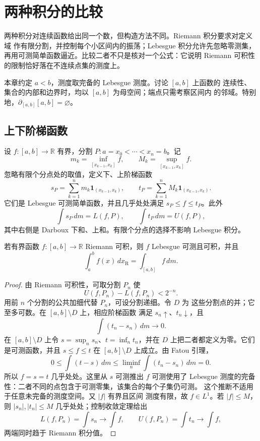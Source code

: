 \chapter{两种积分的比较}
\label{chap:riemann-lebesgue-comparison}

两种积分对连续函数给出同一个数，但构造方法不同。Riemann 积分要求对定义域
作有限分割，并控制每个小区间内的振荡；Lebesgue 积分允许先忽略零测集，
再用可测简单函数逼近。比较二者不只是核对一个公式：它说明 Riemann
可积性的限制恰好落在不连续点集的测度上。

本章约定 \(a<b\)，测度取完备的 Lebesgue 测度。讨论 \([a,b]\) 上函数的
连续性、集合的内部和边界时，均以 \([a,b]\) 为母空间；端点只需考察区间内
的邻域。特别地，\(\partial_{[a,b]}[a,b]=\varnothing\)。

\section{上下阶梯函数}

设 \(f:[a,b]\to\mathbb R\) 有界，分割
\(P:a=x_0<\cdots<x_n=b\)。记
\[
 m_k=\inf_{[x_{k-1},x_k]}f,\qquad
 M_k=\sup_{[x_{k-1},x_k]}f.
\]
忽略有限个分点处的取值，定义下、上阶梯函数
\[
 s_P=\sum_{k=1}^{n}m_k\mathbf1_{(x_{k-1},x_k)},\qquad
 t_P=\sum_{k=1}^{n}M_k\mathbf1_{(x_{k-1},x_k)}.
\]
它们是 Lebesgue 可测简单函数，并且几乎处处满足
\(s_P\le f\le t_P\)。此外
\[
 \int s_P\,dm=L(f,P),\qquad
 \int t_P\,dm=U(f,P),
\]
其中右侧是 Darboux 下和、上和。有限个分点的选择不影响 Lebesgue 积分。

\begin{theorem}[两种积分的一致性]
\label{thm:riemann-lebesgue-agreement}
若有界函数 \(f:[a,b]\to\mathbb R\) Riemann 可积，则 \(f\) Lebesgue
可测且可积，并且
\[
 \int_a^b f(x)\,dx_{\mathrm R}
 =\int_{[a,b]}f\,dm .
\]
\end{theorem}

\begin{proof}
由 Riemann 可积性，可取分割 \(P_n\) 使
\[
 U(f,P_n)-L(f,P_n)<2^{-n}.
\]
用前 \(n\) 个分割的公共加细代替 \(P_n\)，可设分割递细。令 \(D\) 为
这些分割点的并；它至多可数。在 \([a,b]\setminus D\) 上，相应阶梯函数
满足 \(s_n\uparrow\)、\(t_n\downarrow\)，且
\[
 \int(t_n-s_n)\,dm\longrightarrow0.
\]
在 \([a,b]\setminus D\) 上令 \(s=\sup_ns_n\)、\(t=\inf_nt_n\)，并在
\(D\) 上把二者都定义为零。它们是可测函数，并且
\(s\le f\le t\) 在 \([a,b]\setminus D\) 上成立。由 Fatou 引理，
\[
 0\le\int(t-s)\,dm
 \le\liminf_n\int(t_n-s_n)\,dm=0.
\]
所以 \(f=s=t\) 几乎处处。这里从 \(s\) 可测推出 \(f\) 可测使用了 Lebesgue
测度的完备性：二者不同的点包含于可测零集，该集合的每个子集仍可测。
这个推断不适用于任意未完备的测度空间。又 \(|f|\) 有界且区间
测度有限，故 \(f\in L^1\)。若 \(|f|\le M\)，则
\(|s_n|,|t_n|\le M\) 几乎处处；控制收敛定理给出
\[
 L(f,P_n)=\int s_n\longrightarrow\int f,\qquad
 U(f,P_n)=\int t_n\longrightarrow\int f,
\]
两端同时趋于 Riemann 积分值。
\end{proof}

